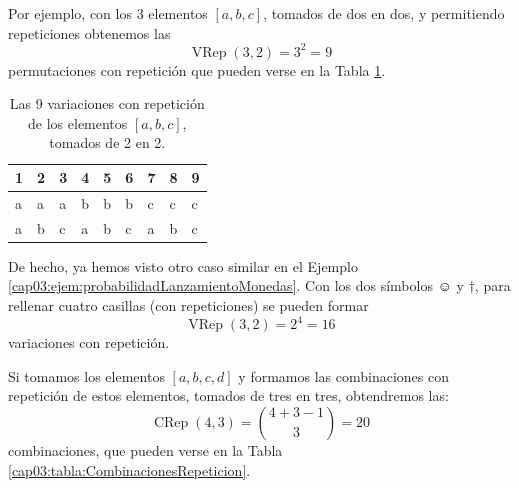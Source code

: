     \begin{center}
    \end{center}
    Por ejemplo, con los 3 elementos $[a,b,c]$, tomados de dos en dos, y permitiendo repeticiones obtenemos las
    \[\operatorname{VRep}(3,2)=3^2=9\]
    permutaciones con repetición que pueden verse en la Tabla \ref{cap03:tabla:variacionesRepeticion}.
        \begin{table}[ht]
        \centering
        \begin{tabular}{lllllllll}
          \hline
          1 & 2 & 3 & 4 & 5 & 6 & 7 & 8 & 9 \\
          \hline
            a & a & a & b & b & b & c & c & c \\
            a & b & c & a & b & c & a & b & c \\
           \hline
        \end{tabular}
        \caption{Las 9 variaciones con repetición de los elementos $[a,b,c]$, tomados de 2 en 2.}\label{cap03:tabla:variacionesRepeticion}
        \end{table}
    De hecho, ya hemos visto otro caso similar en el Ejemplo \ref{cap03:ejem:probabilidadLanzamientoMonedas}. Con los dos símbolos $\smiley$ y $\dagger$, para rellenar cuatro casillas (con repeticiones) se pueden formar
    \[\operatorname{VRep}(3,2)=2^4=16\]
    variaciones con repetición.

    \begin{center}
    \end{center}
    Si tomamos los elementos $[a,b,c,d]$ y formamos las combinaciones con repetición de estos elementos, tomados de tres en tres, obtendremos las:
    \[\operatorname{CRep}(4,3)=\binom{4+3-1}{3}=20\]
    combinaciones, que pueden verse en la Tabla \ref{cap03:tabla:CombinacionesRepeticion}.


